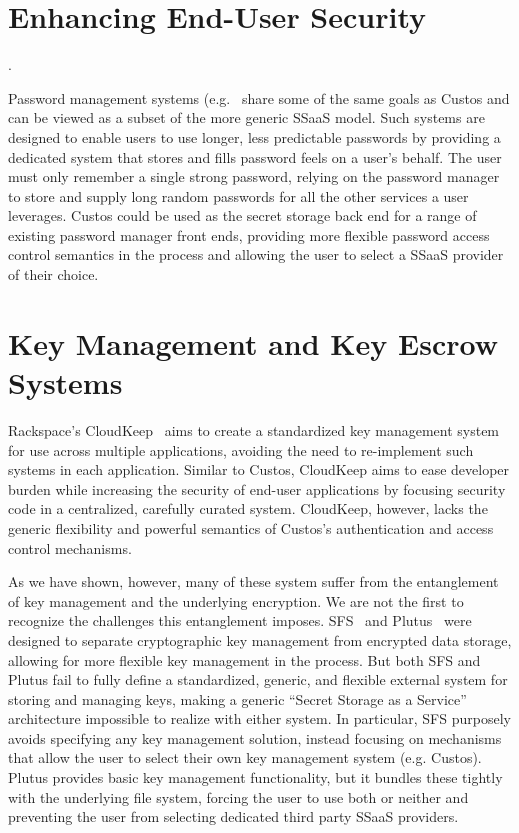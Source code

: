 \section{Enhancing End-User Security}
\cite{openpgp, pgp, gnupg}
\cite{enigmail, mailpile, Koch2011}
\cite{lastpass, onepassword, apple-icloud}
\cite{schneier-passwords, krebs-passwords, brodkin-passman}.
\cite{spideroak}

Password management systems (e.g.~\cite{lastpass} share some of the
same goals as Custos and can be viewed as a subset of the more generic
SSaaS model. Such systems are designed to enable users to use longer,
less predictable passwords by providing a dedicated system that stores
and fills password feels on a user's behalf. The user must only
remember a single strong password, relying on the password manager to
store and supply long random passwords for all the other services a
user leverages. Custos could be used as the secret storage back end
for a range of existing password manager front ends, providing more
flexible password access control semantics in the process and allowing
the user to select a SSaaS provider of their choice.

\section{Key Management and Key Escrow Systems}
\cite{Blaze1996, Denning1996}
\cite{cloudkeep-presentation, cloudkeep}
\cite{gazzang, porticor, Rosen2012}
\cite{amazon-hsm}

Rackspace's CloudKeep~\cite{cloudkeep} aims to create a standardized
key management system for use across multiple applications, avoiding
the need to re-implement such systems in each application. Similar to
Custos, CloudKeep aims to ease developer burden while increasing the
security of end-user applications by focusing security code in a
centralized, carefully curated system. CloudKeep, however, lacks the
generic flexibility and powerful semantics of Custos's authentication
and access control mechanisms.

As we have shown, however, many
of these system suffer from the entanglement of key management and the
underlying encryption. We are not the first to recognize the
challenges this entanglement imposes. SFS~\cite{Mazieres1999} and
Plutus~\cite{kallahalla2003} were designed to separate cryptographic
key management from encrypted data storage, allowing for more flexible
key management in the process. But both SFS and Plutus fail to fully
define a standardized, generic, and flexible external system for
storing and managing keys, making a generic ``Secret Storage as a
Service'' architecture impossible to realize with either system. In
particular, SFS purposely avoids specifying any key management
solution, instead focusing on mechanisms that allow the user to select
their own key management system (e.g. Custos). Plutus provides basic
key management functionality, but it bundles these tightly with the
underlying file system, forcing the user to use both or neither and
preventing the user from selecting dedicated third party SSaaS
providers.


